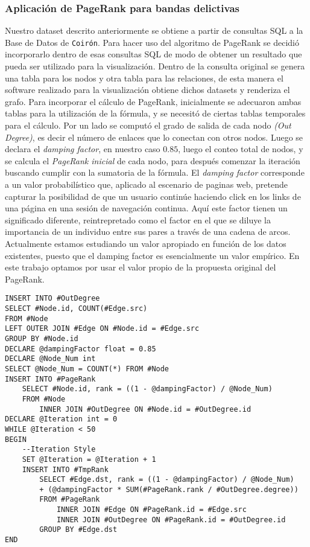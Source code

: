 \subsubsection{Aplicación de PageRank para bandas delictivas}
Nuestro dataset descrito anteriormente se obtiene a partir de consultas SQL a la Base de Datos de \texttt{Coirón}. Para hacer uso del algoritmo de PageRank se decidió incorporarlo dentro de esas consultas SQL de modo de obtener un resultado que pueda ser utilizado para la visualización. Dentro de la consulta original se genera una tabla para los nodos y otra tabla para las relaciones, de esta manera el software realizado para la visualización obtiene dichos datasets y renderiza el grafo.
Para incorporar el cálculo de PageRank, inicialmente se adecuaron ambas tablas para la utilización de la fórmula, y se necesitó de ciertas tablas temporales para el cálculo. Por un lado se computó el grado de salida de cada nodo \textit{(Out Degree)}, es decir el número de enlaces que lo conectan con otros nodos.
Luego se declara el \textit{damping factor}, en nuestro caso $0.85$, luego el conteo total de nodos, y se calcula el \textit{PageRank inicial} de cada nodo, para después comenzar la iteración buscando cumplir con la sumatoria de la fórmula.
El \textit{damping factor} corresponde a un valor probabilístico que, aplicado al escenario de paginas web, pretende capturar la posibilidad de que un usuario continúe haciendo click en los links de una página en una sesión de navegación continua. 
Aquí este factor tienen un significado diferente, reintrepretado como el factor en el que se diluye la importancia de un individuo entre sus pares a través de una cadena de arcos. Actualmente estamos estudiando un valor apropiado en función de los datos existentes, puesto que el damping factor es esencialmente un valor empírico. En este trabajo optamos por usar el valor propio de la propuesta original del PageRank.

\begin{multicols}{2}
\tiny{
\begin{verbatim}
INSERT INTO #OutDegree
SELECT #Node.id, COUNT(#Edge.src)
FROM #Node 
LEFT OUTER JOIN #Edge ON #Node.id = #Edge.src
GROUP BY #Node.id
DECLARE @dampingFactor float = 0.85
DECLARE @Node_Num int
SELECT @Node_Num = COUNT(*) FROM #Node
INSERT INTO #PageRank
	SELECT #Node.id, rank = ((1 - @dampingFactor) / @Node_Num)
	FROM #Node 
		INNER JOIN #OutDegree ON #Node.id = #OutDegree.id
DECLARE @Iteration int = 0
WHILE @Iteration < 50
BEGIN
	--Iteration Style
	SET @Iteration = @Iteration + 1
	INSERT INTO #TmpRank
		SELECT #Edge.dst, rank = ((1 - @dampingFactor) / @Node_Num) 
		+ (@dampingFactor * SUM(#PageRank.rank / #OutDegree.degree))
		FROM #PageRank 
			INNER JOIN #Edge ON #PageRank.id = #Edge.src
			INNER JOIN #OutDegree ON #PageRank.id = #OutDegree.id
		GROUP BY #Edge.dst
END
\end{verbatim}
}
\end{multicols}

